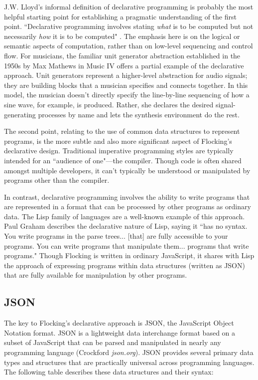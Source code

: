 \documentclass{article}
\begin{document}
J.W. Lloyd's informal definition of declarative programming is probably the most helpful starting point for establishing a pragmatic understanding of the first point. ``Declarative programming involves stating {\it what} is to be computed but not necessarily {\it how} it is to be computed" \cite{lloyd1994practical}. The emphasis here is on the logical or semantic aspects of computation, rather than on low-level sequencing and control flow. For musicians, the familiar unit generator abstraction established in the 1950s by Max Mathews in Music IV \cite{mathews1969technology} offers a partial example of the declarative approach. Unit generators represent a higher-level abstraction for audio signals; they are building blocks that a musician specifies and connects together. In this model, the musician doesn't directly specify the line-by-line sequencing of how a sine wave, for example, is produced. Rather, she declares the desired signal-generating processes by name and lets the synthesis environment do the rest.

The second point, relating to the use of common data structures to represent programs, is the more subtle and also more significant aspect of Flocking's declarative design. Traditional imperative programming styles are typically intended for an ``audience of one"---the compiler. Though code is often shared amongst multiple developers, it can’t typically be understood or manipulated by programs other than the compiler.

In contrast, declarative programming involves the ability to write programs that are represented in a format that can be processed by other programs as ordinary data. The Lisp family of languages are a well-known example of this approach. Paul Graham describes the declarative nature of Lisp, saying it ``has no syntax. You write programs in the parse trees... [that] are fully accessible to your programs. You can write programs that manipulate them... programs that write programs." Though Flocking is written in ordinary JavaScript, it shares with Lisp the approach of expressing programs within data structures (written as JSON) that are fully available for manipulation by other programs.

\subsection{JSON}

The key to Flocking's declarative approach is JSON, the JavaScript Object Notation format. JSON is a lightweight data interchange format based on a subset of JavaScript that can be parsed and manipulated in nearly any programming language (Crockford {\it json.org}). JSON provides several primary data types and structures that are practically universal across programming languages. The following table describes these data structures and their syntax:
\end{document}
